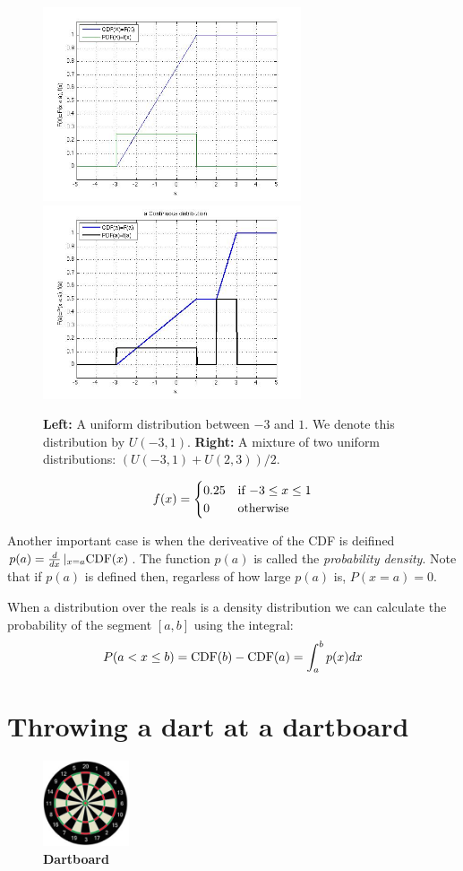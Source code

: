 \begin{figure}[t]
\begin{center}
\includegraphics[width=3in]{figs/Uniform.jpg}
\includegraphics[width=3in]{figs/unifMixture2CDF.jpg}
\end{center}
\caption{{\bf Left:} A uniform distribution between $-3$ and $1$. We
  denote this distribution by $U(-3,1)$. {\bf Right:} A mixture of two
  uniform distributions: $(U(-3,1)+U(2,3))/2$.}
\end{figure}

\[
f(x) = \begin{cases}
0.25 & \mbox{if $ -3 \leq x \leq 1$} \\
0 & \mbox{otherwise}
\end{cases}
\]

Another important case is when the deriveative of the CDF is deifined
$p(a) = \frac{d}{dx}\left|_{x=a} \mbox{CDF}(x)\right.$. The function $p(a)$
is called the {\em probability density}. Note that if $p(a)$ is
defined then, regarless of how large $p(a)$ is, $P(x=a)=0$.

When a distribution over the reals is a density distribution we can
calculate the probability of the segment $[a,b]$ using the integral:
\[
P(a < x \leq b)=\mbox{CDF}(b)-\mbox{CDF}(a)=\int_a^b p(x) dx
\]

\section{Throwing a dart at a dartboard} 
\begin{figure}[H]
\begin{center}
\includegraphics[width=1in]{figs/dartboard.jpg}
\end{center}
\caption{{\bf Dartboard}
 \label{fig:Dartboard}}
\end{figure}



